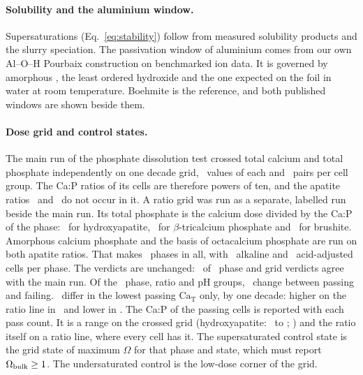\paragraph*{Solubility and the aluminium window.}
Supersaturations (Eq.~\eqref{eq:stability}) follow from measured solubility products and the slurry speciation. %
The passivation window of aluminium comes from our own Al--O--H Pourbaix construction on benchmarked ion data\cite{persson2012prediction}. %
It is governed by amorphous , the least ordered hydroxide and the one expected on the foil in water at room temperature. %
Boehmite is the reference, and both published windows are shown beside them\cite{kuhnel2016water}. %

\paragraph*{Dose grid and control states.}
The main run of the phosphate dissolution test crossed total calcium and total phosphate independently on one decade grid, \NumRegGridCaCount\ values of each and \NumRegGridPairs\ pairs per cell group. %
The Ca:P ratios of its cells are therefore powers of ten, and the apatite ratios \NumRatioTcp\ and \NumRatioHap\ do not occur in it. %
A ratio grid was run as a separate, labelled run beside the main run. %
Its total phosphate is the calcium dose divided by the Ca:P of the phase: \NumRatioHap\ for hydroxyapatite, \NumRatioTcp\ for $\beta$-tricalcium phosphate and \NumRatioBrushite\ for brushite. %
Amorphous calcium phosphate and the  basis of octacalcium phosphate are run on both apatite ratios. %
That makes \NumRatioPhases\ phases in all, with \NumRatioCellsAlkaline\ alkaline and \NumRatioCellsAcid\ acid-adjusted cells per phase. %
The verdicts are unchanged: \NumRatioVerdictSame\ of \NumRatioVerdictTotal\ phase and grid verdicts agree with the main run. %
Of the \NumRatioGroups\ phase, ratio and pH groups, \NumRatioFlips\ change between passing and failing. %
\NumRatioGroupsDiffer\ differ in the lowest passing $\mathrm{Ca_T}$ only, by one decade: higher on the ratio line in \NumRatioGroupsHigher\ and lower in \NumRatioGroupsLower. %
The Ca:P of the passing cells is reported with each pass count. %
It is a range on the crossed grid (hydroxyapatite: \NumRegCaPHapLo\ to \NumRegCaPHapHi; ) and the ratio itself on a ratio line, where every cell has it. %
The supersaturated control state is the grid state of maximum $\Omega$ for that phase and state, which must report $\Omega_\mathrm{bulk}\ge1$. %
The undersaturated control is the low-dose corner of the grid. %

